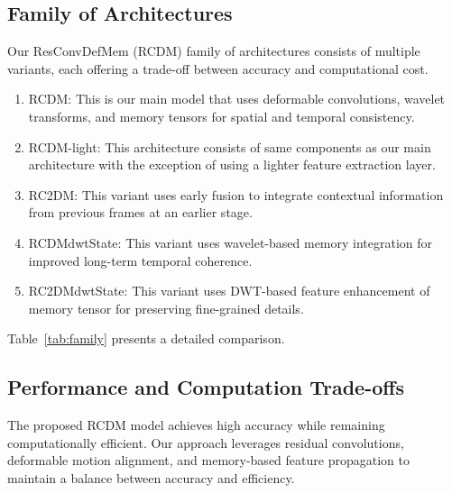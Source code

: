 \documentclass[11pt]{article}
\begin{document}
\subsection{Family of Architectures}
Our ResConvDefMem (RCDM) family of architectures consists of multiple variants, each offering a trade-off between accuracy and computational cost. 

\begin{enumerate}
    \item RCDM: This is our main model that uses deformable convolutions, wavelet transforms, and memory tensors for spatial and temporal consistency. 
    \item RCDM-light: This architecture consists of same components as our main architecture with the exception of using a lighter feature extraction layer.
    \item RC2DM: This variant uses early fusion to integrate contextual information from previous frames at an earlier stage. 
    \item RCDMdwtState: This variant uses wavelet-based memory integration for improved long-term temporal coherence. 
    \item RC2DMdwtState: This variant uses DWT-based feature enhancement of memory tensor for preserving fine-grained details.
\end{enumerate}
Table~\ref{tab:family} presents a detailed comparison.

\begin{table}[h]
\centering
\caption{Comparison of the RCDM family of architectures.}
\label{tab:family}
\end{table}

\subsection{Performance and Computation Trade-offs}
The proposed RCDM model achieves high accuracy while remaining computationally efficient. Our approach leverages residual convolutions, deformable motion alignment, and memory-based feature propagation to maintain a balance between accuracy and efficiency.
\end{document}
